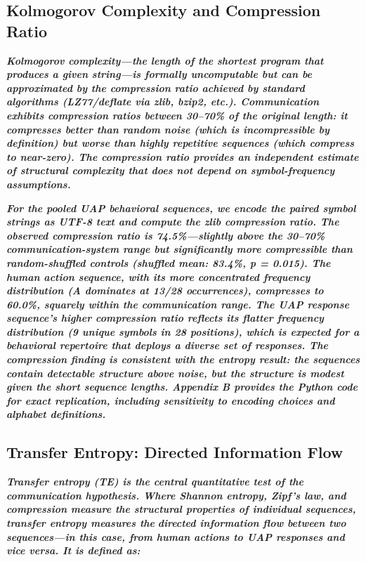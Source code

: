 \documentclass[11pt,letterpaper]{article}
\begin{document}
\subsection{Kolmogorov Complexity and Compression Ratio}

\textbf{\textit{Kolmogorov complexity---the length of the shortest program that produces a given string---is formally uncomputable but can be approximated by the compression ratio achieved by standard algorithms (LZ77/deflate via zlib, bzip2, etc.). Communication exhibits compression ratios between 30--70\% of the original length: it compresses better than random noise (which is incompressible by definition) but worse than highly repetitive sequences (which compress to near-zero). The compression ratio provides an independent estimate of structural complexity that does not depend on symbol-frequency assumptions.}}


\textbf{\textit{For the pooled UAP behavioral sequences, we encode the paired symbol strings as UTF-8 text and compute the zlib compression ratio. The observed compression ratio is 74.5\%---slightly above the 30--70\% communication-system range but significantly more compressible than random-shuffled controls (shuffled mean: 83.4\%, p = 0.015). The human action sequence, with its more concentrated frequency distribution (A dominates at 13/28 occurrences), compresses to 60.0\%, squarely within the communication range. The UAP response sequence's higher compression ratio reflects its flatter frequency distribution (9 unique symbols in 28 positions), which is expected for a behavioral repertoire that deploys a diverse set of responses. The compression finding is consistent with the entropy result: the sequences contain detectable structure above noise, but the structure is modest given the short sequence lengths. Appendix B provides the Python code for exact replication, including sensitivity to encoding choices and alphabet definitions.}}


\subsection{Transfer Entropy: Directed Information Flow}

\textbf{\textit{Transfer entropy (TE) is the central quantitative test of the communication hypothesis. Where Shannon entropy, Zipf's law, and compression measure the structural properties of individual sequences, transfer entropy measures the }}\textbf{\textit{directed information flow between two sequences}}\textbf{\textit{---in this case, from human actions to UAP responses and vice versa. It is defined as:}}
\end{document}
